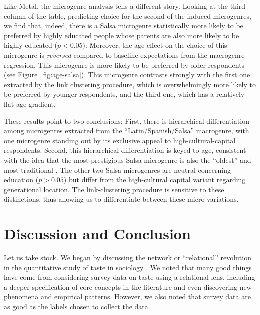 \documentclass[a4paper,12pt]{article}
\begin{document}
Like Metal, the microgenre analysis tells a different story. Looking at the third column of the table, predicting choice for the second of the induced microgenres, we find that, indeed, there is a Salsa microgenre statistically more likely to be preferred by highly educated people whose parents are also more likely to be highly educated ($p < 0.05$). Moreover, the age effect on the choice of this microgenre is \textit{reversed} compared to baseline expectations from the macrogenre regression. This microgenre is more likely to be preferred by older respondents (see Figure~\ref{fig:age-salsa}). This microgenre contrasts strongly with the first one extracted by the link clustering procedure, which is overwhelmingly more likely to be preferred by younger respondents, and the third one, which has a relatively flat age gradient. 

These results point to two conclusions: First, there is hierarchical differentiation among microgenres extracted from the ``Latin/Spanish/Salsa'' macrogenre, with one microgenre standing out by its exclusive appeal to high-cultural-capital respondents. Second, this hierarchical differentiation is keyed to age, consistent with the idea that the most prestigious Salsa microgenre is also the ``oldest'' and most traditional \citep{Bachmayer2014-pk}. The other two Salsa microgenres are neutral concerning education ($p > 0.05$) but differ from the high-cultural capital variant regarding generational location. The link-clustering procedure is sensitive to these distinctions, thus allowing us to differentiate between these micro-variations.

\section{Discussion and Conclusion}
Let us take stock. We began by discussing the network or ``relational'' revolution in the quantitative study of taste in sociology \citep{pachucki2010cultural, vlegels2017music, lizardo14}. We noted that many good things have come from considering survey data on taste using a relational lens, including a deeper specification of core concepts in the literature and even discovering new phenomena and empirical patterns. However, we also noted that survey data are as good as the labels chosen to collect the data. 
\end{document}
